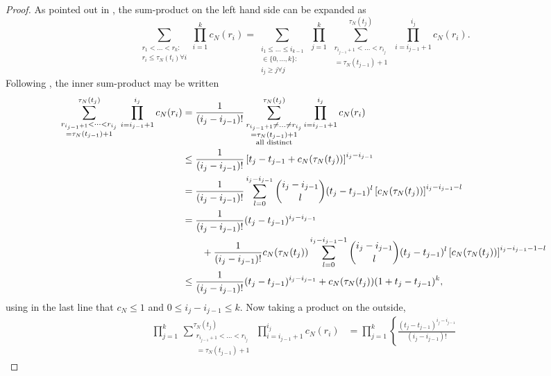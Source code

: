 \documentclass{article}
\newcommand{\1}[1]{\mathbbm{1}_{#1}}
\begin{document}
\begin{proof}
As pointed out in \citet[p.~460]{mohle1999}, the sum-product on the left hand side can be expanded as
\begin{equation}
\sum_{\substack{r_1<\dots<r_k :\\ r_i\leq \tau_N(t_i) \forall i}} \prod_{i=1}^k c_N(r_i)
= \sum_{\substack{i_1\leq \dots\leq i_{k-1}\\ \in \{0,\dots,k\} :\\ i_j \geq j \forall j}} \, \prod_{j=1}^k \,
\sum_{\substack{ r_{i_{j-1}+1} < \dots < r_{i_j} \\ = \tau_N(t_{j-1})+1}}^{\tau_N(t_j)}  \,\prod_{i=i_{j-1}+1}^{i_j} c_N(r_i) .
\end{equation}
Following \citet[(8)--(9)]{koskela2018}, the inner sum-product may be written
\begin{align}
\sum_{\substack{ r_{i_{j-1}+1} < \dots < r_{i_j} \\ = \tau_N(t_{j-1})+1}}^{\tau_N(t_j)}  \,\prod_{i=i_{j-1}+1}^{i_j} c_N(r_i)
&= \frac{1}{(i_j - i_{j-1})!} \sum_{\substack{ r_{i_{j-1}+1} \neq \dots \neq r_{i_j} \\ = \tau_N(t_{j-1})+1 \\ \text{all distinct}}}^{\tau_N(t_j)}
\prod_{i=i_{j-1}+1}^{i_j} c_N(r_i) \notag\\
&\leq \frac{1}{(i_j - i_{j-1})!} \left[ t_j - t_{j-1} + c_N(\tau_N(t_j)) \right]^{i_j - i_{j-1}} \notag\\
&= \frac{1}{(i_j - i_{j-1})!} \sum_{l=0}^{i_j - i_{j-1}} \binom{i_j - i_{j-1}}{l} (t_j - t_{j-1})^l \left[ c_N(\tau_N(t_j)) \right]^{i_j - i_{j-1}-l} \notag\\
&= \frac{1}{(i_j - i_{j-1})!} (t_j - t_{j-1})^{i_j - i_{j-1}} \notag\\
&\qquad+ \frac{1}{(i_j - i_{j-1})!} c_N(\tau_N(t_j)) \sum_{l=0}^{i_j - i_{j-1} -1} \binom{i_j - i_{j-1}}{l} (t_j - t_{j-1})^l \left[ c_N(\tau_N(t_j)) \right]^{i_j - i_{j-1}-1-l} \notag\\
&\leq \frac{1}{(i_j - i_{j-1})!} (t_j - t_{j-1})^{i_j - i_{j-1}} 
+ c_N(\tau_N(t_j)) (1+ t_j - t_{j-1})^k ,
\end{align}
using in the last line that $c_N \leq 1$ and $0 \leq i_j - i_{j-1} \leq k$.
Now taking a product on the outside,
\begin{align}
\prod_{j=1}^k \,
\sum_{\substack{ r_{i_{j-1}+1} < \dots < r_{i_j} \\ = \tau_N(t_{j-1})+1}}^{\tau_N(t_j)}  \,\prod_{i=i_{j-1}+1}^{i_j} c_N(r_i)
&= \prod_{j=1}^k \left\{ \frac{(t_j - t_{j-1})^{i_j - i_{j-1}}}{(i_j - i_{j-1})!}  

\end{align}
\end{proof}
\end{document}
